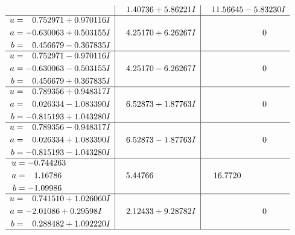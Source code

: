 \documentclass[1p]{elsarticle_modified}
\theoremstyle{definition}
\begin{document}
$$\begin{array}{c|c|c}
 & \phantom{-}1.40736 + 5.86221 I & \phantom{-}11.56645 - 5.83230 I \\ \hline\begin{aligned}
u &= \phantom{-}0.752971 + 0.970116 I \\
a &= -0.630063 + 0.503155 I \\
b &= \phantom{-}0.456679 - 0.367835 I\end{aligned}
 & \phantom{-}4.25170 + 6.26267 I & \phantom{-0.000000 } 0 \\ \hline\begin{aligned}
u &= \phantom{-}0.752971 - 0.970116 I \\
a &= -0.630063 - 0.503155 I \\
b &= \phantom{-}0.456679 + 0.367835 I\end{aligned}
 & \phantom{-}4.25170 - 6.26267 I & \phantom{-0.000000 } 0 \\ \hline\begin{aligned}
u &= \phantom{-}0.789356 + 0.948317 I \\
a &= \phantom{-}0.026334 - 1.083390 I \\
b &= -0.815193 + 1.043280 I\end{aligned}
 & \phantom{-}6.52873 + 1.87763 I & \phantom{-0.000000 } 0 \\ \hline\begin{aligned}
u &= \phantom{-}0.789356 - 0.948317 I \\
a &= \phantom{-}0.026334 + 1.083390 I \\
b &= -0.815193 - 1.043280 I\end{aligned}
 & \phantom{-}6.52873 - 1.87763 I & \phantom{-0.000000 } 0 \\ \hline\begin{aligned}
u &= -0.744263\phantom{ +0.000000I} \\
a &= \phantom{-}1.16786\phantom{ +0.000000I} \\
b &= -1.09986\phantom{ +0.000000I}\end{aligned}
 & \phantom{-}5.44766\phantom{ +0.000000I} & \phantom{-}16.7720\phantom{ +0.000000I} \\ \hline\begin{aligned}
u &= \phantom{-}0.741510 + 1.026060 I \\
a &= -2.01086 + 0.29598 I \\
b &= \phantom{-}0.288482 + 1.092220 I\end{aligned}
 & \phantom{-}2.12433 + 9.28782 I & \phantom{-0.000000 } 0\\
 \hline 
 \end{array}$$\newpage$$\begin{array}{c|c|c}  

\end{array}$$
\end{document}
